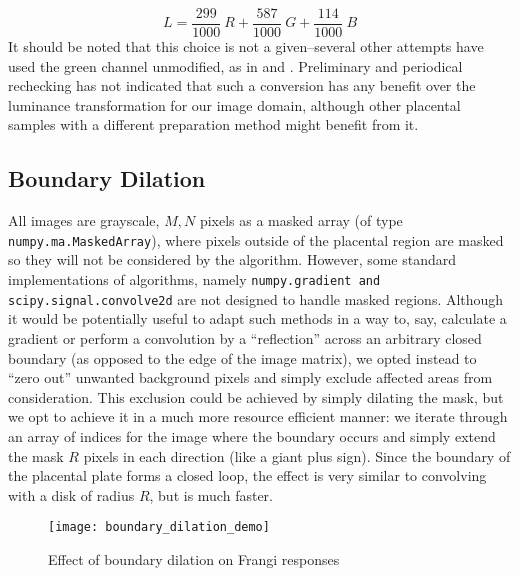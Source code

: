     \begin{equation} \label{eq:luma_transform}
    L =  \frac{299}{1000}\ R + \frac{587}{1000}\ G + \frac{114}{1000}\ B
    \end{equation}
    It should be noted that this choice is not a given--several other attempts have used the green channel unmodified, as in \cite{almoussa-ucla-reu} and \cite{huynh2013filter}. Preliminary and periodical rechecking has not indicated that such a conversion has any benefit over the luminance transformation for our image domain, although other placental samples with a different preparation method might benefit from it.

    \subsection{Boundary Dilation} \label{sec:boundary-dilation}
    
    All images are grayscale, $M,N$ pixels as a masked array (of type
    \texttt{numpy.ma.MaskedArray}), where pixels outside of the placental region are masked so they will not be considered by the algorithm. However, some standard
    implementations of algorithms, namely \texttt{numpy.gradient and scipy.signal.convolve2d} are not designed to handle masked regions. Although it would be potentially useful to adapt such methods in a way to, say, calculate a gradient or perform a convolution by a ``reflection'' across an arbitrary closed boundary (as opposed to the edge of the image matrix), we opted instead to ``zero out'' unwanted background pixels and simply exclude affected areas from consideration. This exclusion could be achieved by
    simply dilating the mask, but we opt to achieve it in a much more resource efficient manner: we iterate through an array of indices for the image where the boundary occurs and simply extend the mask $R$ pixels in each direction (like a giant plus sign). Since the boundary of the placental plate forms a closed loop, the effect is very similar to convolving with a disk of radius $R$, but is much faster.
    
    \begin{figure} 
        \texttt{[image: boundary\_dilation\_demo]}
        \caption{Effect of boundary dilation on Frangi responses}
        \label{fig:boundary-demo}
    \end{figure}
    
